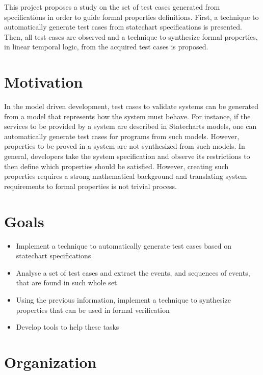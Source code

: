 This project proposes a study on the set of test cases generated from specifications in order to guide formal properties definitions. First, a technique to automatically generate test cases from statechart specifications is presented. Then, all test cases are observed and a technique to synthesize formal properties, in linear temporal logic, from the acquired test cases is proposed. 

\section{Motivation}

In the model driven development, test cases to validate systems can be generated from a model that represents how the system must behave. For instance, if the services to be provided by a system are described in Statecharts models, one can  automatically generate test cases for programs from such models. However, properties to be proved in a system are not synthesized from such models. In general, developers take the system specification and observe its restrictions to then define which properties should be satisfied. However, creating such properties requires a strong mathematical background and translating system requirements to formal properties is not trivial process\cite{Prospec}.

\section{Goals}

\begin{itemize}

\item Implement a technique to automatically generate test cases based on statechart specifications

\item Analyse a set of test cases and extract the events, and sequences of events, that are found in such whole set

\item Using the previous information, implement a technique to synthesize properties that can be used in formal verification 

\item Develop tools to help these tasks

\end{itemize}

\section{Organization}

